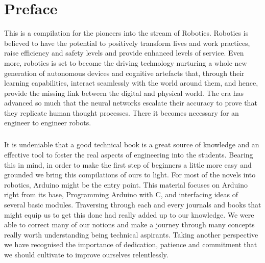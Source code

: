 \chapter*{Preface}
\begin{fullwidth}
\justify
\par This is a compilation for the pioneers into the stream of Robotics. Robotics is believed to have the potential to positively transform lives and work practices, raise efficiency and safety levels and provide enhanced levels of service. Even more, robotics is set to become the driving technology nurturing a whole new generation of autonomous devices and cognitive artefacts that, through their learning capabilities, interact seamlessly with the world around them, and hence, provide the missing link between the digital and physical world. The era has advanced so much that the neural networks escalate their accuracy to prove that they replicate human thought processes. There it becomes necessary for an engineer to engineer robots.
\vspace{5mm}
\paragraph{ } It is undeniable that a good technical book is a great source of knowledge and an effective tool to foster the real aspects of engineering into the students. Bearing this in mind, in order to make the first step of beginners a little more easy and grounded we bring this compilations of ours to light. For most of the novels into robotics, Arduino might be the entry point. This material focuses on Arduino right from its base, Programming Arduino with C, and interfacing ideas of several basic modules. Traversing through each and every journals and books that might equip us to get this done had really added up to our knowledge. We were able to correct many of our notions and make a journey through many concepts really worth understanding being technical aspirants. Taking another perspective we have recognised the importance of dedication, patience and commitment that we should cultivate to improve ourselves relentlessly.
\end{fullwidth}